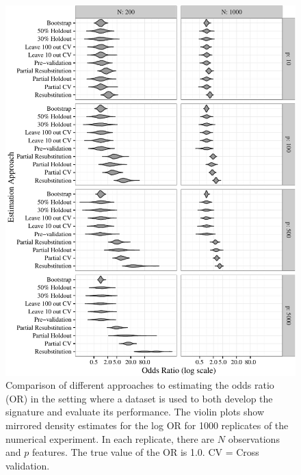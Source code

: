 \documentclass[11pt,]{article}
\begin{document}
\begin{figure}[htbp]
\centering
\includegraphics{paper-revised-round2_files/figure-latex/cvsims2-1.pdf}
\caption{Comparison of different approaches to estimating the odds ratio
(OR) in the setting where a dataset is used to both develop the
signature and evaluate its performance. The violin plots show mirrored
density estimates for the log OR for 1000 replicates of the numerical
experiment. In each replicate, there are \(N\) observations and \(p\)
features. The true value of the OR is 1.0. CV = Cross validation.
\label{fig2}}
\end{figure}
\end{document}
